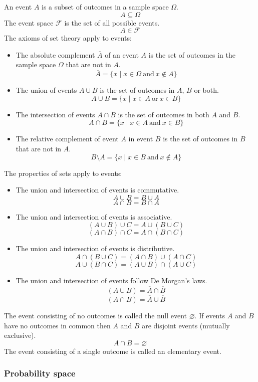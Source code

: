 \documentclass{article}
\begin{document}
An event $A$ is a subset of outcomes in a sample space $\Omega$.
\[A \subseteq \Omega\]
The event space $\mathcal{F}$ is the set of all possible events.
\[A \in \mathcal{F}\]
The axioms of set theory apply to events:
\begin{itemize}
\item The absolute complement $\overline{A}$ of an event $A$ is the set of outcomes in the sample space $\Omega$ that are not in $A$.
\[\overline{A}= \{x \mid x \in \Omega \ \mathrm{and} \ x \notin A\} \]
\item The union of events $A \cup B$ is the set of outcomes in $A$, $B$ or both.
\[A \cup B = \{x \mid x \in A \ \mathrm{or} \ x \in B\} \]
\item The intersection of events $A \cap B$ is the set of outcomes in both $A$ and $B$.
\[A \cap B = \{x \mid x \in A \ \mathrm{and} \ x \in B\} \]
\item The relative complement of event $A$ in event $B$ is the set of outcomes in $B$ that are not in $A$.
\[B \setminus A = \{x \mid x \in B \ \mathrm{and} \ x \notin A\}\]
\end{itemize}
The properties of sets apply to events:
\begin{itemize}
\item The union and intersection of events is commutative.
\[A \cup B = B \cup A\]
\[A \cap B = B \cap A\]
\item The union and intersection of events is associative.
\[(A \cup B) \cup C = A \cup (B \cup C)\]
\[(A \cap B) \cap C = A \cap (B \cap C)\]
\item The union and intersection of events is distributive.
\[A \cap (B \cup C) = (A \cap B) \cup (A \cap C)\]
\[A \cup (B \cap C) = (A \cup B) \cap (A \cup C)\]
\item The union and intersection of events follow De Morgan's laws.
\[\overline{(A \cup B)} = \overline{A} \cap \overline{B}\]
\[\overline{(A \cap B)} = \overline{A} \cup \overline{B}\]
\end{itemize}
The event consisting of no outcomes is called the null event $\varnothing$. If events $A$ and $B$ have no outcomes in common then $A$ and $B$ are disjoint events (mutually exclusive).
\[A \cap B = \varnothing \]
The event consisting of a single outcome is called an elementary event.

\subsubsection{Probability space}
\end{document}
